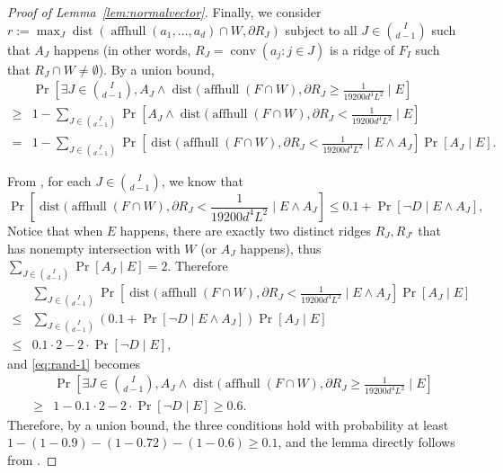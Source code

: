 \documentclass{theoretics}
\newcommand{\aff}{\operatorname{affhull}}
\newcommand{\conv}{\operatorname{conv}}
\newcommand{\dist}{\operatorname{dist}}
\begin{document}
\begin{proof}[Proof of Lemma~\ref{lem:normalvector}]
    Finally, we consider $r := \max_{J} \dist(\aff(a_1, \ldots, a_d) \cap W, \partial R_J)$ subject to all $J \in \binom{I}{d-1}$ such that $A_J$ happens (in other words, $R_J = \conv(a_j : j \in J)$ is a ridge of $F_I$ such that $R_J \cap W \neq \emptyset$). By a union bound,
    \begin{align}\label{eq:rand-1}
        & \Pr\left[ \exists J \in \binom{I}{d-1}, A_J \wedge \dist(\aff(F \cap W), \partial R_J \geq \frac{1}{19200d^4L^2} \mid E \right] \nonumber \\
        \geq & 1 - \sum_{J \in \binom{I}{d-1}} \Pr[ A_J \wedge \dist(\aff(F \cap W), \partial R_{J} < \frac{1}{19200d^4L^2} \mid E ] \nonumber \\
        = & 1 - \sum_{J \in \binom{I}{d-1}} \Pr[ \dist(\aff(F \cap W), \partial R_{J} < \frac{1}{19200d^4L^2} \mid E \wedge A_J ] \Pr[A_J \mid E ] .
    \end{align}

    From , for each $J \in \binom{I}{d-1}$, we know that
    \[
        \Pr[\dist(\aff(F \cap W), \partial R_J < \frac{1}{19200d^4L^2} \mid E \wedge A_J ]
        \leq 0.1 + \Pr[\neg D \mid E \wedge A_J],
    \]
    Notice that when $E$ happens, there are exactly two distinct ridges $R_{J}, R_{J'}$ that has nonempty intersection with $W$ (or $A_J$ happens), thus $\sum_{J \in \binom{I}{d-1}} \Pr[A_J \mid E] = 2$.
    Therefore
    \begin{align*}
        &  \sum_{J \in \binom{I}{d-1}} \Pr[ \dist(\aff(F \cap W), \partial R_{J} < \frac{1}{19200d^4L^2} \mid E \wedge A_J ] \Pr[A_J \mid E ] \\
        \leq &  \sum_{J \in \binom{I}{d-1}} (0.1 +  \Pr[\neg D \mid E \wedge A_J])\Pr[A_J \mid E ] \\
        \leq &  0.1 \cdot 2 - 2\cdot\Pr[\neg D \mid E] ,
    \end{align*}
    and \eqref{eq:rand-1} becomes
    \begin{align*}
        & \Pr\left[ \exists J \in \binom{I}{d-1}, A_J \wedge \dist(\aff(F \cap W), \partial R_J \geq \frac{1}{19200d^4L^2} \mid E  \right]  \\
        \geq & 1 - 0.1 \cdot 2 - 2\cdot\Pr[\neg D \mid E] \geq 0.6 .
    \end{align*}
    Therefore, by a union bound, the three conditions hold with probability at least $1 - (1 - 0.9) - (1 - 0.72) - (1 - 0.6) \geq 0.1$, and the lemma directly follows from .
\end{proof}
\end{document}
